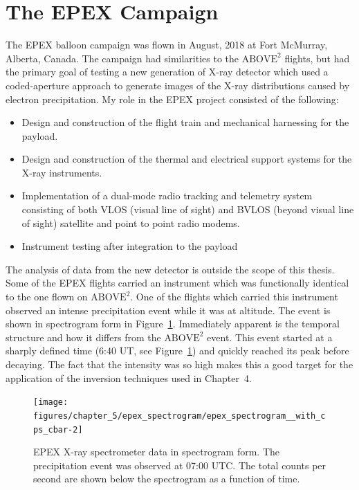 \newpage
\section{The EPEX Campaign}

The EPEX balloon campaign was flown in August, 2018 at Fort McMurray, Alberta, Canada. The campaign had similarities to the $\text{ABOVE}^2$ flights, but had the primary goal of testing a new generation of X-ray detector which used a coded-aperture approach to generate images of the X-ray distributions caused by electron precipitation. My role in the EPEX project consisted of the following:

\begin{itemize}
\item Design and construction of the flight train and mechanical harnessing for the payload.
\item Design and construction of the thermal and electrical support systems for the X-ray instruments.	
\item Implementation of a dual-mode radio tracking and telemetry system consisting of both VLOS (visual line of sight) and BVLOS (beyond visual line of sight) satellite and point to point radio modems.
\item Instrument testing after integration to the payload
\end{itemize}

The analysis of data from the new detector is outside the scope of this thesis. Some of the EPEX flights carried an instrument which was functionally identical to the one flown on $\text{ABOVE}^2$. One of the flights which carried this instrument observed an intense precipitation event while it was at altitude. The event is shown in spectrogram form in Figure~\ref{epex_event_spectrogram}. Immediately apparent is the temporal structure and how it differs from the $\text{ABOVE}^2$ event. This event started at a sharply defined time (6:40 UT, see Figure~\ref{epex_event_spectrogram}) and quickly reached its peak before decaying. The fact that the intensity was so high makes this a good target for the application of the inversion techniques used in Chapter~4. 

\begin{figure}[p]
    \centering
    \texttt{[image: figures/chapter\_5/epex\_spectrogram/epex\_spectrogram\_\_with\_cps\_cbar-2]}
    \caption{EPEX X-ray spectrometer data in spectrogram form. The precipitation event was observed at 07:00 UTC. The total counts per second are shown below the spectrogram as a function of time.}
    \label{epex_event_spectrogram}
\end{figure}

